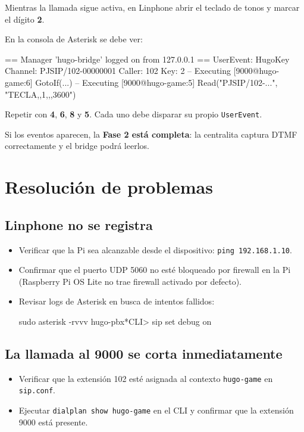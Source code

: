 Mientras la llamada sigue activa, en Linphone abrir el teclado de tonos y marcar el dígito \textbf{2}.

En la consola de Asterisk se debe ver:

\begin{plaincode}
== Manager 'hugo-bridge' logged on from 127.0.0.1
== UserEvent: HugoKey
   Channel: PJSIP/102-00000001
   Caller: 102
   Key: 2
-- Executing [9000@hugo-game:6] GotoIf(...)
-- Executing [9000@hugo-game:5] Read("PJSIP/102-...", "TECLA,,1,,,3600")
\end{plaincode}

Repetir con \textbf{4}, \textbf{6}, \textbf{8} y \textbf{5}. Cada uno debe disparar su propio \texttt{UserEvent}.

Si los eventos aparecen, la \textbf{Fase 2 está completa}: la centralita captura DTMF correctamente y el bridge podrá leerlos.

\section{Resolución de problemas}

\subsection{Linphone no se registra}

\begin{itemize}
  \item Verificar que la Pi sea alcanzable desde el dispositivo: \texttt{ping 192.168.1.10}.
  \item Confirmar que el puerto UDP 5060 no esté bloqueado por firewall en la Pi (Raspberry Pi OS Lite no trae firewall activado por defecto).
  \item Revisar logs de Asterisk en busca de intentos fallidos:
  \begin{shellcode}
sudo asterisk -rvvv
hugo-pbx*CLI> sip set debug on
  \end{shellcode}
\end{itemize}

\subsection{La llamada al 9000 se corta inmediatamente}

\begin{itemize}
  \item Verificar que la extensión 102 esté asignada al contexto \texttt{hugo-game} en \texttt{sip.conf}.
  \item Ejecutar \texttt{dialplan show hugo-game} en el CLI y confirmar que la extensión 9000 está presente.
\end{itemize}

